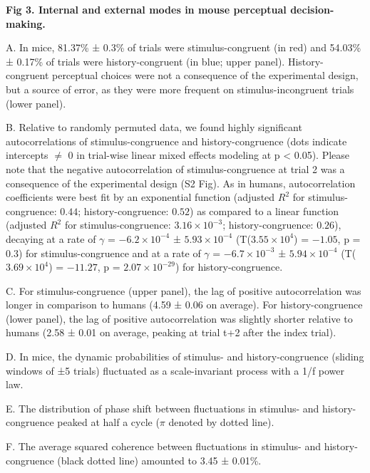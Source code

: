 \documentclass[
]{article}
\begin{document}

\textbf{Fig 3. Internal and external modes in mouse perceptual
decision-making.}

A. In mice, 81.37\% ± 0.3\% of trials were stimulus-congruent (in red)
and 54.03\% ± 0.17\% of trials were history-congruent (in blue; upper
panel). History-congruent perceptual choices were not a consequence of
the experimental design, but a source of error, as they were more
frequent on stimulus-incongruent trials (lower panel).

B. Relative to randomly permuted data, we found highly significant
autocorrelations of stimulus-congruence and history-congruence (dots
indicate intercepts \(\neq\) 0 in trial-wise linear mixed effects
modeling at p \textless{} 0.05). Please note that the negative
autocorrelation of stimulus-congruence at trial 2 was a consequence of
the experimental design (S2 Fig). As in humans,
autocorrelation coefficients were best fit by an exponential function
(adjusted \(R^2\) for stimulus-congruence: \(0.44\); history-congruence:
\(0.52\)) as compared to a linear function (adjusted \(R^2\) for
stimulus-congruence: \(\ensuremath{3.16\times 10^{-3}}\);
history-congruence: \(0.26\)), decaying at a rate of \(\gamma\) =
\(\ensuremath{-6.2\times 10^{-4}}\) ±
\(\ensuremath{5.93\times 10^{-4}}\)
(T(\(\ensuremath{3.55\times 10^{4}}\)) = \(-1.05\), p = \(0.3\)) for
stimulus-congruence and at a rate of \(\gamma\) =
\(\ensuremath{-6.7\times 10^{-3}}\) ±
\(\ensuremath{5.94\times 10^{-4}}\)
(T(\(\ensuremath{3.69\times 10^{4}}\)) = \(-11.27\), p =
\(\ensuremath{2.07\times 10^{-29}}\)) for history-congruence.

C. For stimulus-congruence (upper panel), the lag of positive
autocorrelation was longer in comparison to humans (4.59 ± 0.06 on
average). For history-congruence (lower panel), the lag of positive
autocorrelation was slightly shorter relative to humans (2.58 ± 0.01 on
average, peaking at trial t+2 after the index trial).

D. In mice, the dynamic probabilities of stimulus- and
history-congruence (sliding windows of ±5 trials) fluctuated as a
scale-invariant process with a 1/f power law.

E. The distribution of phase shift between fluctuations in stimulus- and
history-congruence peaked at half a cycle (\(\pi\) denoted by dotted
line).

F. The average squared coherence between fluctuations in stimulus- and
history-congruence (black dotted line) amounted to 3.45 ± 0.01\%.
\end{document}
